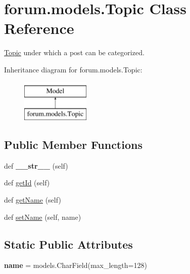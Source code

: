 \hypertarget{classforum_1_1models_1_1_topic}{}\section{forum.\+models.\+Topic Class Reference}
\label{classforum_1_1models_1_1_topic}


\mbox{\hyperlink{classforum_1_1models_1_1_topic}{Topic}} under which a post can be categorized.  


Inheritance diagram for forum.\+models.\+Topic\+:\begin{figure}[H]
\begin{center}
\leavevmode
\includegraphics[height=2.000000cm]{classforum_1_1models_1_1_topic}
\end{center}
\end{figure}
\subsection*{Public Member Functions}
\begin{DoxyCompactItemize}
\item 
\mbox{\label{classforum_1_1models_1_1_topic_ac0d9e96ea50559f864d9e6b8c3823146}} 
def {\bfseries \+\_\+\+\_\+str\+\_\+\+\_\+} (self)
\item 
def \mbox{\hyperlink{classforum_1_1models_1_1_topic_ae321a4274c1abfc3d41f1611b877c361}{get\+Id}} (self)
\item 
def \mbox{\hyperlink{classforum_1_1models_1_1_topic_af6c46b55d4c745aa779ac1bd95f430d3}{get\+Name}} (self)
\item 
def \mbox{\hyperlink{classforum_1_1models_1_1_topic_ae3784c5c9abe0e44ca41f692328570c4}{set\+Name}} (self, name)
\end{DoxyCompactItemize}
\subsection*{Static Public Attributes}
\begin{DoxyCompactItemize}
\item 
\mbox{\label{classforum_1_1models_1_1_topic_ac91fb6ab845f1f10a20db8f9d022358a}} 
{\bfseries name} = models.\+Char\+Field(max\+\_\+length=128)
\end{DoxyCompactItemize}


